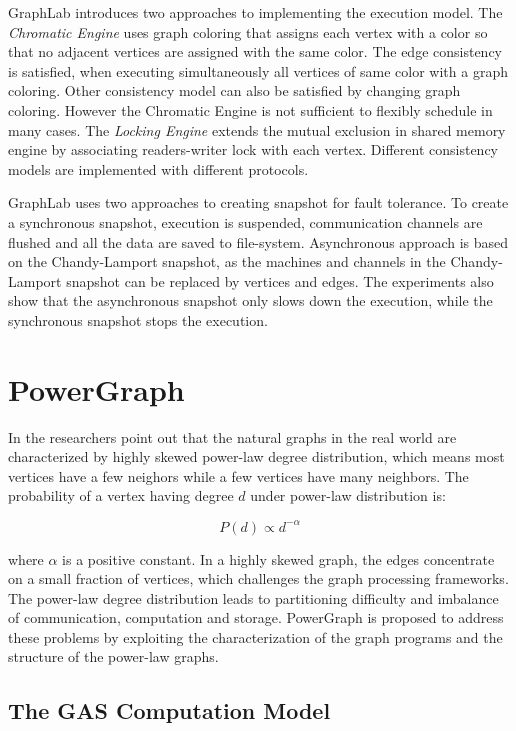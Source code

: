 GraphLab introduces two approaches to implementing the execution model. The \textit{Chromatic Engine} uses graph coloring that assigns each vertex with a color so that no adjacent vertices are assigned with the same color. The edge consistency is satisfied, when executing simultaneously all vertices of same color with a graph coloring. Other consistency model can also be satisfied by changing graph coloring. However the Chromatic Engine is not sufficient to flexibly schedule in many cases. The \textit{Locking Engine} extends the mutual exclusion in shared memory engine by associating readers-writer lock with each vertex. Different consistency models are implemented with different protocols.

GraphLab uses two approaches to creating snapshot for fault tolerance. To create a synchronous snapshot, execution is suspended, communication channels are flushed and all the data are saved to file-system. Asynchronous approach is based on the Chandy-Lamport snapshot, as the machines and channels in the Chandy-Lamport snapshot can be replaced by vertices and edges. The experiments also show that the asynchronous snapshot only slows down the execution, while the synchronous snapshot stops the execution.

\section{PowerGraph}

In \cite{gonzalez2012powergraph} the researchers point out that the natural graphs in the real world are characterized by highly skewed power-law degree distribution, which means most vertices have a few neighors while a few vertices have many neighbors. The probability of a vertex having degree $d$ under power-law distribution is:

\begin{equation}\label{eq:PowerLawDegree}
P(d) \propto d^{-\alpha}
\end{equation}

where $\alpha$ is a positive constant. In a highly skewed graph, the edges concentrate on a small fraction of vertices, which challenges the graph processing frameworks. The power-law degree distribution leads to partitioning difficulty and imbalance of communication, computation and storage. PowerGraph is proposed to address these problems by exploiting the characterization of the graph programs and the structure of the power-law graphs.

\subsection{The GAS Computation Model}

